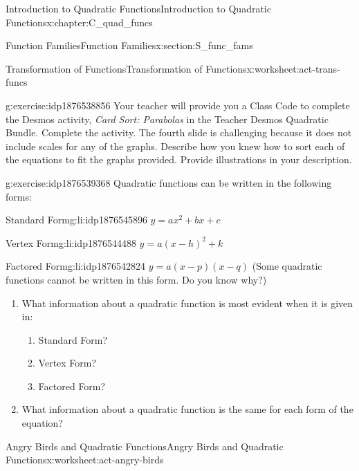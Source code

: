\documentclass[oneside,10pt,]{book}
\newcommand{\pubtitle}[1]{\textsl{#1}}
\numberwithin{equation}{chapter}
\begin{document}
\begin{chapterptx}{Introduction to Quadratic Functions}{}{Introduction to Quadratic Functions}{}{}{x:chapter:C_quad_funcs}
\begin{sectionptx}{Function Families}{}{Function Families}{}{}{x:section:S_func_fams}
\begin{worksheet-subsection}{Transformation of Functions}{}{Transformation of Functions}{}{}{x:worksheet:act-trans-funcs}
\begin{divisionexercise}{7}{}{}{g:exercise:idp1876538856}
Your teacher will provide you a Class Code to complete the Desmos activity, \pubtitle{Card Sort: Parabolas} in the Teacher Desmos Quadratic Bundle. Complete the activity. The fourth slide is challenging because it does not include scales for any of the graphs. Describe how you knew how to sort each of the equations to fit the graphs provided. Provide illustrations in your description.%
\end{divisionexercise}%
\begin{divisionexercise}{8}{}{}{g:exercise:idp1876539368}%
Quadratic functions can be written in the following forms\textasteriskcentered{}:%
\begin{descriptionlist}
\begin{dlimedium}{Standard Form}{g:li:idp1876545896}%
\(\displaystyle y=ax^2 +bx+c\)%
\end{dlimedium}%
\begin{dlimedium}{Vertex Form}{g:li:idp1876544488}%
\(\displaystyle y=a(x-h)^2 +k\)%
\end{dlimedium}%
\begin{dlimedium}{Factored Form}{g:li:idp1876542824}%
\(y = a(x - p)(x - q)\) (\textasteriskcentered{}Some quadratic functions cannot be written in this form. Do you know why?)%
\end{dlimedium}%
\end{descriptionlist}
%
\begin{enumerate}[font=\bfseries,label=(\alph*),ref=\alph*]
\item{}What information about a quadratic function is most evident when it is given in:%
\begin{enumerate}[font=\bfseries,label=(\roman*),ref=\theenumi.\roman*]
\item{}Standard Form?%
\item{}Vertex Form?%
\item{}Factored Form?%
\end{enumerate}
\item{}What information about a quadratic function is the same for each form of the equation?%
\end{enumerate}
\end{divisionexercise}%
\end{worksheet-subsection}
\restoregeometry
%
%
\typeout{************************************************}
\typeout{************************************************}
%
\begin{worksheet-subsection}{Angry Birds and Quadratic Functions}{}{Angry Birds and Quadratic Functions}{}{}{x:worksheet:act-angry-birds}

\end{worksheet-subsection}
\end{sectionptx}
\end{chapterptx}
\end{document}

